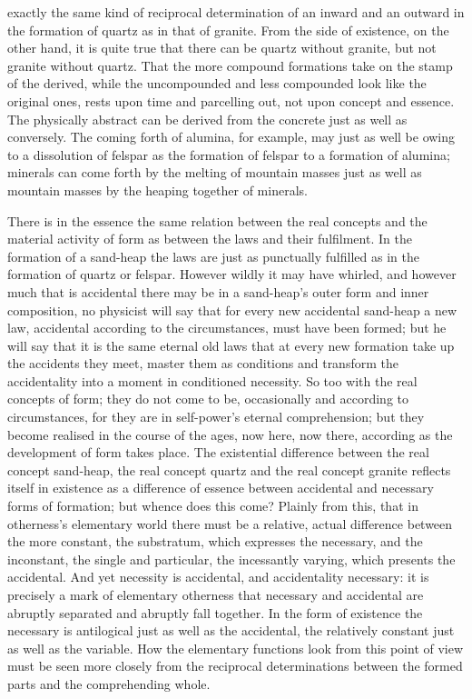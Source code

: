 \documentclass[12pt,a4paper]{book}
\begin{document}
exactly the same kind of reciprocal determination of an inward and an outward in the formation of quartz as in that of
granite. From the side of existence, on the other hand, it is quite true that there can be quartz without granite, but
not granite without quartz. That the more compound formations take on the stamp of the derived, while the uncompounded
and less compounded look like the original ones, rests upon time and parcelling out, not upon concept and essence. The
physically abstract can be derived from the concrete just as well as conversely. The coming forth of alumina, for
example, may just as well be owing to a dissolution of felspar as the formation of felspar to a formation of alumina;
minerals can come forth by the melting of mountain masses just as well as mountain masses by the heaping together of
minerals.

There is in the essence the same relation between the real concepts and the material activity of form as between the laws
and their fulfilment. In the formation of a sand-heap the laws are just as punctually fulfilled as in the formation of
quartz or felspar. However wildly it may have whirled, and however much that is accidental there may be in a sand-heap's
outer form and inner composition, no physicist will
say that for every new accidental sand-heap a new law, accidental according to the circumstances, must have been formed;
but he will say that it is the same eternal old laws that at every new formation take up the accidents they meet, master
them as conditions and transform the accidentality into a moment in conditioned necessity. So too with the real concepts
of form; they do not come to be, occasionally and according to circumstances, for they are in self-power's eternal
comprehension; but they become realised in the course of the ages, now here, now there, according as the development of
form takes place. The existential difference between the real concept sand-heap, the real concept quartz and the real
concept granite reflects itself in existence as a difference of essence between accidental and necessary forms of
formation; but whence does this come? Plainly from this, that in otherness's elementary world there must be a relative,
actual difference between the more constant, the substratum, which expresses the necessary, and the inconstant, the
single and particular, the incessantly varying, which presents the accidental. And yet necessity is accidental, and
accidentality necessary: it is precisely a mark of elementary otherness that necessary and accidental are abruptly
separated and abruptly fall together. In the form of existence the necessary is antilogical just as well as the
accidental, the relatively constant just as well as the variable. How the elementary functions look from this point of
view must be seen more closely from the reciprocal determinations between the formed parts and the comprehending whole.
\end{document}
